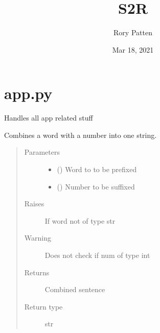 \documentclass[letterpaper,10pt,english]{sphinxmanual}
\title{S2R}
\date{Mar 18, 2021}
\author{Rory Patten}
\begin{document}
\pagestyle{empty}
\sphinxmaketitle
\pagestyle{plain}
\sphinxtableofcontents
\pagestyle{normal}
\label{\detokenize{index::doc}}


\chapter{app.py}
\label{\detokenize{index:app-py}}
\sphinxAtStartPar
Handles all app related stuff

\begin{fulllineitems}
\label{\detokenize{index:project_folder.app.adder}}
\sphinxAtStartPar
Combines a word with a number into one string.
\begin{quote}\begin{description}
\item[{Parameters}] \leavevmode\begin{itemize}
\item {} 
\sphinxAtStartPar
{} () \textendash{} Word to to be prefixed

\item {} 
\sphinxAtStartPar
{} () \textendash{} Number to be suffixed

\end{itemize}

\item[{Raises}] \leavevmode
\sphinxAtStartPar
{} \textendash{} If word not of type str

\item[{Warning}] \leavevmode
\sphinxAtStartPar
Does not check if num of type int

\item[{Returns}] \leavevmode
\sphinxAtStartPar
Combined sentence

\item[{Return type}] \leavevmode
\sphinxAtStartPar
str

\end{description}\end{quote}

\end{fulllineitems}
\end{document}
